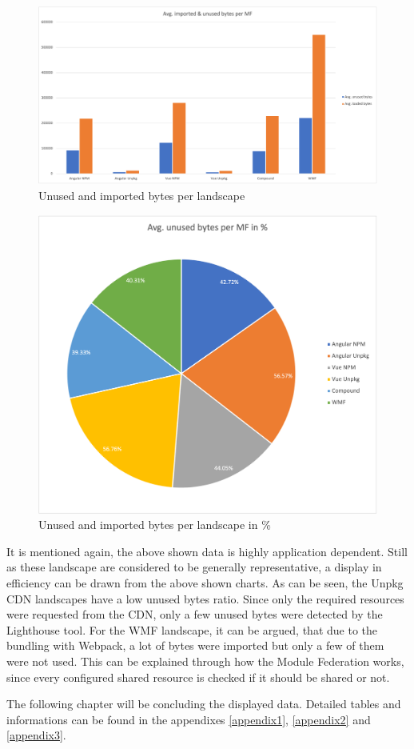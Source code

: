 \begin{figure}[!h]
	\centering
	\includegraphics[width=1\textwidth]{Figures/avg_unsed_imported_1.png}
	\caption{Unused and imported bytes per landscape}
	\label{fig:unsed_imported_1}
\end{figure}

\begin{figure}[!h]
	\centering
	\includegraphics[width=1\textwidth]{Figures/avg_unsed_imported_2.png}
	\caption{Unused and imported bytes per landscape in \%}
	\label{fig:unsed_imported_2}
\end{figure}

It is mentioned again, the above shown data is highly application dependent. Still as these landscape are considered to be generally representative, a display in efficiency can be drawn from the above shown charts.
As can be seen, the Unpkg CDN landscapes have a low unused bytes ratio. Since only the required resources were requested from the CDN, only a few unused bytes were detected by the Lighthouse tool. 
For the WMF landscape, it can be argued, that due to the bundling with Webpack, a lot of bytes were imported but only a few of them were not used. This can be explained through how the Module Federation works, since every configured shared resource is checked if it should be shared or not.

The following chapter will be concluding the displayed data. Detailed tables and informations can be found in the appendixes \ref{appendix1}, \ref{appendix2} and \ref{appendix3}.
